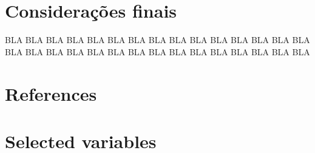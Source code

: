 \documentclass[review]{elsarticle}
\begin{document}
\section{Considerações finais}
\label{sec:conclu}
\noindent


BLA BLA BLA BLA BLA BLA BLA BLA BLA BLA BLA BLA BLA BLA BLA BLA BLA BLA BLA BLA BLA BLA BLA BLA BLA BLA BLA BLA BLA BLA

\newpage


\section*{References}


\newpage


\appendix




\section{Selected variables}
\label{sec:selecvar}
\end{document}
